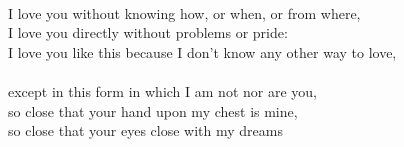 \begin{Parallel}{0.48\textwidth}{0.48\textwidth}
{\-\ \\ I love you without knowing how, or when, or from where,\\
I love you directly without problems or pride:\\
I love you like this because I don’t know any other way to love,\\

\-\ \\ except in this form in which I am not nor are you,\\
so close that your hand upon my chest is mine,\\
so close that your eyes close with my dreams}
\ParallelPar
\end{Parallel}